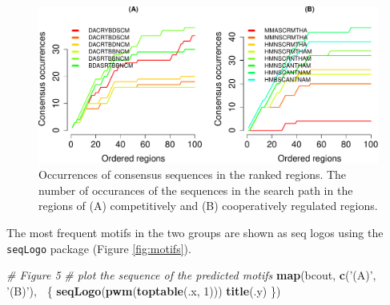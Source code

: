 \documentclass[9pt,a4paper,]{extarticle}
\newenvironment{Shaded}{\begin{snugshade}}{\end{snugshade}}
\newcommand{\CommentTok}[1]{\textcolor[rgb]{0.56,0.35,0.01}{\textit{#1}}}
\newcommand{\DecValTok}[1]{\textcolor[rgb]{0.00,0.00,0.81}{#1}}
\newcommand{\KeywordTok}[1]{\textcolor[rgb]{0.13,0.29,0.53}{\textbf{#1}}}
\newcommand{\NormalTok}[1]{#1}
\newcommand{\OperatorTok}[1]{\textcolor[rgb]{0.81,0.36,0.00}{\textbf{#1}}}
\newcommand{\StringTok}[1]{\textcolor[rgb]{0.31,0.60,0.02}{#1}}
\begin{document}
\begin{figure}

{\centering \includegraphics[width=1\linewidth]{targetFlow_files/figure-latex/occurrences-1} 

}

\caption{Occurrences of consensus sequences in the ranked regions. The number of occurances of the sequences in the search path in the regions of (A) competitively and (B) cooperatively regulated regions.}\label{fig:occurrences}
\end{figure}

The most frequent motifs in the two groups are shown as seq logos using the \texttt{seqLogo} package (Figure \ref{fig:motifs}).

\begin{Shaded}
\begin{Highlighting}[]
\CommentTok{# Figure 5}
\CommentTok{# plot the sequence of the predicted motifs}
\KeywordTok{map}\NormalTok{(bcout, }\KeywordTok{c}\NormalTok{(}\StringTok{'(A)'}\NormalTok{, }\StringTok{'(B)'}\NormalTok{), }\OperatorTok{~}\NormalTok{\{}
    \KeywordTok{seqLogo}\NormalTok{(}\KeywordTok{pwm}\NormalTok{(}\KeywordTok{toptable}\NormalTok{(.x, }\DecValTok{1}\NormalTok{)))}
    \KeywordTok{title}\NormalTok{(.y)}
\NormalTok{\})}
\end{Highlighting}
\end{Shaded}
\end{document}
